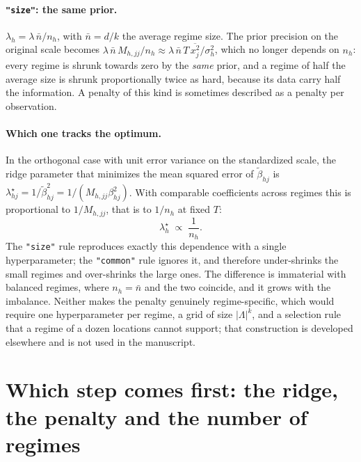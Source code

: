 \documentclass[11pt]{article}
\begin{document}
\paragraph{\texttt{"size"}: the same prior.} $\lambda_h = \lambda\,\bar n/n_h$, with $\bar n = d/k$ the average regime size. The prior precision on the original scale becomes $\lambda\,\bar n\,M_{h,jj}/n_h \approx \lambda\,\bar n\,T\,\overline{x^2_j}/\sigma^2_h$, which no longer depends on $n_h$: every regime is shrunk towards zero by the \emph{same} prior, and a regime of half the average size is shrunk proportionally twice as hard, because its data carry half the information. A penalty of this kind is sometimes described as a penalty per observation.

\paragraph{Which one tracks the optimum.} In the orthogonal case with unit error variance on the standardized scale, the ridge parameter that minimizes the mean squared error of $\tilde\beta_{hj}$ is $\lambda^\star_{hj} = 1/\tilde\beta_{hj}^2 = 1/(M_{h,jj}\beta_{hj}^2)$. With comparable coefficients across regimes this is proportional to $1/M_{h,jj}$, that is to $1/n_h$ at fixed $T$:
\begin{equation}\label{eq:sm:lamstar}
  \lambda^\star_h \;\propto\; \frac{1}{n_h} .
\end{equation}
The \texttt{"size"} rule reproduces exactly this dependence with a single hyperparameter; the \texttt{"common"} rule ignores it, and therefore under-shrinks the small regimes and over-shrinks the large ones. The difference is immaterial with balanced regimes, where $n_h = \bar n$ and the two coincide, and it grows with the imbalance. Neither makes the penalty genuinely regime-specific, which would require one hyperparameter per regime, a grid of size $|\Lambda|^k$, and a selection rule that a regime of a dozen locations cannot support; that construction is developed elsewhere and is not used in the manuscript.

\section{Which step comes first: the ridge, the penalty and the number of regimes}\label{sm:order}
\end{document}
